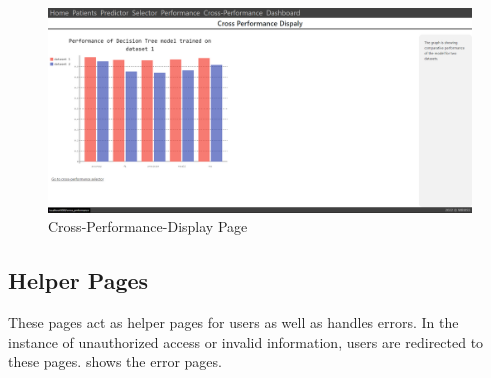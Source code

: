\begin{figure}[H]
  \centering
  \includegraphics[width=0.7\columnwidth]{media/website/pages/cross_performance_display.png}
  \caption{Cross-Performance-Display Page}
  \label{fig:web_cross_performance_display_page}
\end{figure}

\subsection{Helper Pages} \label{subsec:helper_page}
These pages act as helper pages for users as well as handles errors. In the instance of unauthorized access or invalid information, users are redirected to these pages.  shows the error pages.

